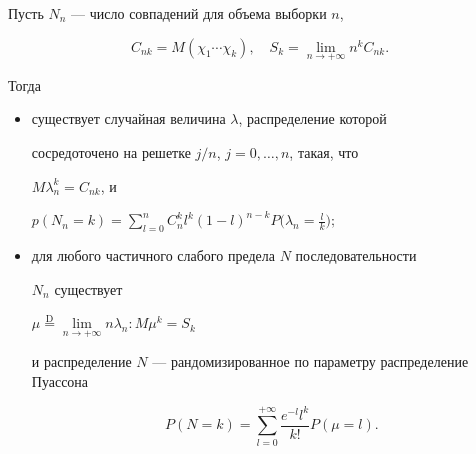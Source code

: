 \begin{thm}


Пусть $N_n$ --- число совпадений для объема выборки $n$,


$$


C_{nk}=M(\chi_1\dotsb \chi_k), \quad S_k=\lim_{n \to +\infty}n^kC_{nk}.


$$


Тогда


\begin{itemize}


\item[а)] существует случайная величина $\lambda$, распределение которой


сосредоточено на решетке $j/n$, $j=0,\dotsc,n$, такая, что


$M\lambda_n^k=C_{nk}$, и


$p(N_n=k)=\sum\limits_{l=0}^n C_n^k l^k(1-l)^{n-k}P


\big(\lambda_n=\frac{l}{k}\bigr);$


\item[б)] для любого частичного слабого предела $N$ последовательности


$N_n$ существует


$\mu \overset{\mathrm D}{=}{} \lim\limits_{n \to +\infty}


n\lambda_n : M\mu^k=S_k$


и распределение $N$ --- рандомизированное по параметру распределение Пуассона


$$


P(N=k)=\sum_{l=0}^{+\infty}\frac{e^{-l}l^k}{k!}P(\mu=l).


$$


\end{itemize}


\end{thm}





